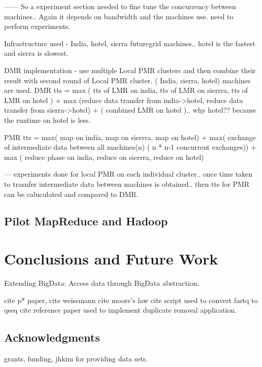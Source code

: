\documentclass{acm_proc_article-sp}
\begin{document}
------ So a experiment section needed to fine tune the concurrency between machines.. Again it depends on bandwidth and the machines use. need to perform experiments.

Infrastructure used - India, hotel, sierra futuregrid machines.. hotel is the fastest and sierra is slowest.

DMR implementation - use multiple Local PMR clusters and then combine their result with second round of Local PMR cluster. ( India, sierra, hotel) machines are used.
DMR tts = max ( tts of LMR on india, tts of LMR  on sierrra, tts of LMR  on hotel ) + max (reduce data transfer from india->hotel, reduce data transfer from sierra->hotel) + ( combined LMR on hotel ).. why hotel?? because the runtime on hotel is less.  

PMR tts = max( map  on india, map on  sierrra, map on hotel) + max( exchange of intermediate data between all machines(n) ( n * n-1 concurrent exchanges)) + max ( reduce phase on  india, reduce on  sierrra, reduce on hotel)

--- experiments done for local PMR on each individual cluster.. once time taken to trasnfer intermediate data between machines is obtained.. then tts for PMR can be caluculated and compared to DMR.

\subsection{Pilot MapReduce and Hadoop}


\section{Conclusions and Future Work}


Extending BigData: Access data through BigData abstraction.



%

%
%

cite p* paper,
cite weissmann
cite moore's law
cite script used to convert fastq to qseq
cite reference paper used to implement duplicate removal application.


\subsection*{Acknowledgments}
grants, funding, jhkim for providing data sets.
\end{document}
